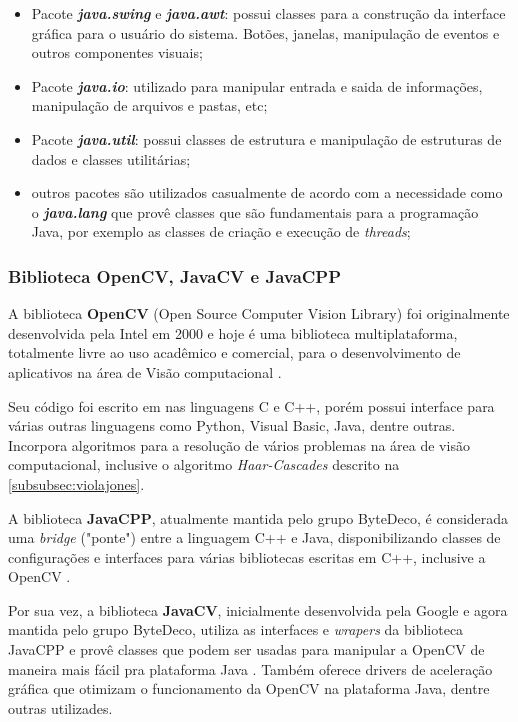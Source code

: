\begin{itemize}
	
	\item Pacote \textbf{\textit{java.swing}} e \textbf{\textit{java.awt}}: possui classes para a construção da interface gráfica para o usuário do sistema. Botões, janelas, manipulação de eventos e outros componentes visuais;
	
	\item Pacote \textbf{\textit{java.io}}: utilizado para manipular entrada e saida de informações, manipulação de arquivos e pastas, etc;
	
	\item Pacote \textbf{\textit{java.util}}: possui classes de estrutura e manipulação de estruturas de dados e classes utilitárias;
	
	\item outros pacotes são utilizados casualmente de acordo com a necessidade como o \textbf{\textit{java.lang}} que provê classes que são fundamentais para a programação Java, por exemplo as classes de criação e execução de \textit{threads};	
	
\end{itemize}

\subsubsection{Biblioteca OpenCV, JavaCV e JavaCPP}\label{subsec:bib_opencv}

A biblioteca \textbf{OpenCV} (Open Source Computer Vision Library) foi originalmente desenvolvida pela Intel em 2000 e hoje é uma biblioteca multiplataforma, totalmente livre ao uso acadêmico e comercial, para o desenvolvimento de aplicativos na área de Visão computacional \cite{opencv}.

Seu código foi escrito em nas linguagens C e C++, porém possui interface para várias outras linguagens como Python, Visual Basic, Java, dentre outras. Incorpora algoritmos para a resolução de vários problemas na área de visão computacional, inclusive o algoritmo \textit{Haar-Cascades} descrito na \autoref{subsubsec:violajones}.

A biblioteca \textbf{JavaCPP}, atualmente mantida pelo grupo ByteDeco, é considerada uma \textit{bridge} ("ponte") entre a linguagem C++ e Java, disponibilizando classes de configurações e interfaces para várias bibliotecas escritas em C++, inclusive a OpenCV \cite{javacpp}.

Por sua vez, a biblioteca \textbf{JavaCV}, inicialmente desenvolvida pela Google e agora mantida pelo grupo ByteDeco, utiliza as interfaces e \textit{wrapers} da biblioteca JavaCPP e provê classes que podem ser usadas para manipular a  OpenCV de maneira mais fácil pra plataforma Java \cite{javacv}. Também oferece drivers de aceleração gráfica que otimizam o funcionamento da OpenCV na plataforma Java, dentre outras utilizades.

